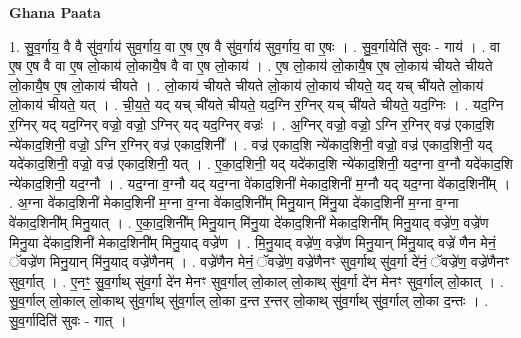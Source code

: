 \documentclass[17pt]{extarticle}
\begin{document}
\textbf{Ghana Paata } \newline

1. सु॒व॒र्गाय॒ वै वै सु॑व॒र्गाय॑ सुव॒र्गाय॒ वा ए॒ष ए॒ष वै सु॑व॒र्गाय॑ सुव॒र्गाय॒ वा ए॒षः । . सु॒व॒र्गायेति॑ सुवः - गाय॑ । . वा ए॒ष ए॒ष वै वा ए॒ष लो॒काय॑ लो॒कायै॒ष वै वा ए॒ष लो॒काय॑ । . ए॒ष लो॒काय॑ लो॒कायै॒ष ए॒ष लो॒काय॑ चीयते चीयते लो॒कायै॒ष ए॒ष लो॒काय॑ चीयते । . लो॒काय॑ चीयते चीयते लो॒काय॑ लो॒काय॑ चीयते॒ यद् यच् ची॑यते लो॒काय॑ लो॒काय॑ चीयते॒ यत् । . ची॒य॒ते॒ यद् यच् ची॑यते चीयते॒ यद॒ग्नि र॒ग्निर् यच् ची॑यते चीयते॒ यद॒ग्निः । . यद॒ग्नि र॒ग्निर् यद् यद॒ग्निर् वज्रो॒ वज्रो॒ ऽग्निर् यद् यद॒ग्निर् वज्रः॑ । . अ॒ग्निर् वज्रो॒ वज्रो॒ ऽग्नि र॒ग्निर् वज्र॑ एकाद॒शि न्ये॑काद॒शिनी॒ वज्रो॒ ऽग्नि र॒ग्निर् वज्र॑ एकाद॒शिनी᳚ । . वज्र॑ एकाद॒शि न्ये॑काद॒शिनी॒ वज्रो॒ वज्र॑ एकाद॒शिनी॒ यद् यदे॑काद॒शिनी॒ वज्रो॒ वज्र॑ एकाद॒शिनी॒ यत् । . ए॒का॒द॒शिनी॒ यद् यदे॑काद॒शि न्ये॑काद॒शिनी॒ यद॒ग्ना व॒ग्नौ यदे॑काद॒शि न्ये॑काद॒शिनी॒ यद॒ग्नौ । . यद॒ग्ना व॒ग्नौ यद् यद॒ग्ना वे॑काद॒शिनी॑ मेकाद॒शिनी॑ म॒ग्नौ यद् यद॒ग्ना वे॑काद॒शिनी᳚म् । . अ॒ग्ना वे॑काद॒शिनी॑ मेकाद॒शिनी॑ म॒ग्ना व॒ग्ना वे॑काद॒शिनी᳚म् मिनु॒यान् मि॑नु॒या दे॑काद॒शिनी॑ म॒ग्ना व॒ग्ना वे॑काद॒शिनी᳚म् मिनु॒यात् । . ए॒का॒द॒शिनी᳚म् मिनु॒यान् मि॑नु॒या दे॑काद॒शिनी॑ मेकाद॒शिनी᳚म् मिनु॒याद् वज्रे॑ण॒ वज्रे॑ण मिनु॒या दे॑काद॒शिनी॑ मेकाद॒शिनी᳚म् मिनु॒याद् वज्रे॑ण । . मि॒नु॒याद् वज्रे॑ण॒ वज्रे॑ण मिनु॒यान् मि॑नु॒याद् वज्रे॑ णैन मेनं॒ ॅवज्रे॑ण मिनु॒यान् मि॑नु॒याद् वज्रे॑णैनम् । . वज्रे॑णैन मेनं॒ ॅवज्रे॑ण॒ वज्रे॑णैनꣳ सुव॒र्गाथ् सु॑व॒र्गा दे॑नं॒ ॅवज्रे॑ण॒ वज्रे॑णैनꣳ सुव॒र्गात् । . ए॒नꣳ॒॒ सु॒व॒र्गाथ् सु॑व॒र्गा दे॑न मेनꣳ सुव॒र्गाल् लो॒काल् लो॒काथ् सु॑व॒र्गा दे॑न मेनꣳ सुव॒र्गाल् लो॒कात् । . सु॒व॒र्गाल् लो॒काल् लो॒काथ् सु॑व॒र्गाथ् सु॑व॒र्गाल् लो॒का द॒न्त र॒न्तर् लो॒काथ् सु॑व॒र्गाथ् सु॑व॒र्गाल् लो॒का द॒न्तः । . सु॒व॒र्गादिति॑ सुवः - गात् । \newline
\end{document}
